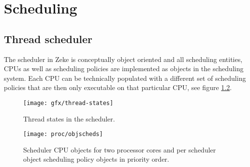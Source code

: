 \chapter{Scheduling}

\section{Thread scheduler}

The scheduler in Zeke is conceptually object oriented and all scheduling
entities, CPUs as well as scheduling policies are implemented as objects in the
scheduling system. Each CPU can be technically populated with a different set of
scheduling policies that are then only executable on that particular CPU, see
figure \ref{figure:objscheds}.

\begin{figure}
  \center
  \texttt{[image: gfx/thread-states]}
  \caption{Thread states in the scheduler.}
  \label{figure:threadstates}
\end{figure}

\begin{figure}
  \center
  \texttt{[image: proc/objscheds]}
  \caption{Scheduler CPU objects for two processor cores and
           per scheduler object scheduling policy objects in
           priority order.}
  \label{figure:objscheds}
\end{figure}
